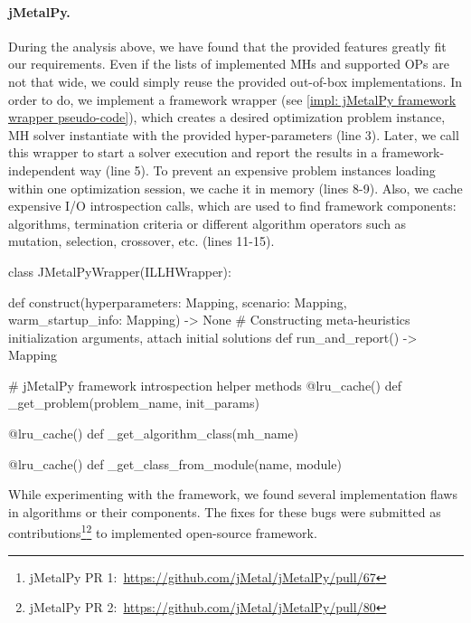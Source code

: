 \paragraph{jMetalPy.} During the analysis above, we have found that the provided features greatly fit our requirements. Even if the lists of implemented MHs and supported OPs are not that wide, we could simply reuse the provided out-of-box implementations. In order to do, we implement a framework wrapper (see \cref{impl: jMetalPy framework wrapper pseudo-code}), which creates a desired optimization problem instance, MH solver instantiate with the provided hyper-parameters (line 3). Later, we call this wrapper to start a solver execution and report the results in a framework-independent way (line 5). To prevent an expensive problem instances loading within one optimization session, we cache it in memory (lines 8-9). Also, we cache expensive I/O introspection calls, which are used to find framework components: algorithms, termination criteria or different algorithm operators such as mutation, selection, crossover, etc. (lines 11-15).

\begin{code}[language=Python, caption=jMetalPy framework wrapper pseudo-code., label=impl: jMetalPy framework wrapper pseudo-code]
class JMetalPyWrapper(ILLHWrapper):

	def construct(hyperparameters: Mapping, scenario: Mapping, warm_startup_info: Mapping) -> None
		# Constructing meta-heuristics initialization arguments, attach initial solutions
	def run_and_report() -> Mapping

	# jMetalPy framework introspection helper methods
	@lru_cache()
	def _get_problem(problem_name, init_params)
	
	@lru_cache()
	def _get_algorithm_class(mh_name)
	
	@lru_cache()
	def _get_class_from_module(name, module)
\end{code}

While experimenting with the framework, we found several implementation flaws in algorithms or their components. The fixes for these bugs were submitted as contributions\footnote{jMetalPy PR 1:~\url{https://github.com/jMetal/jMetalPy/pull/67}}\footnote{jMetalPy PR 2:~\url{https://github.com/jMetal/jMetalPy/pull/80}} to implemented open-source framework.

